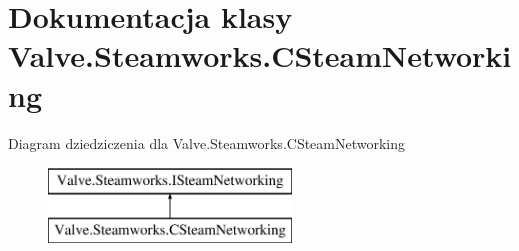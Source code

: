 \hypertarget{class_valve_1_1_steamworks_1_1_c_steam_networking}{}\section{Dokumentacja klasy Valve.\+Steamworks.\+C\+Steam\+Networking}
\label{class_valve_1_1_steamworks_1_1_c_steam_networking}
Diagram dziedziczenia dla Valve.\+Steamworks.\+C\+Steam\+Networking\begin{figure}[H]
\begin{center}
\leavevmode
\includegraphics[height=2.000000cm]{class_valve_1_1_steamworks_1_1_c_steam_networking}
\end{center}
\end{figure}
